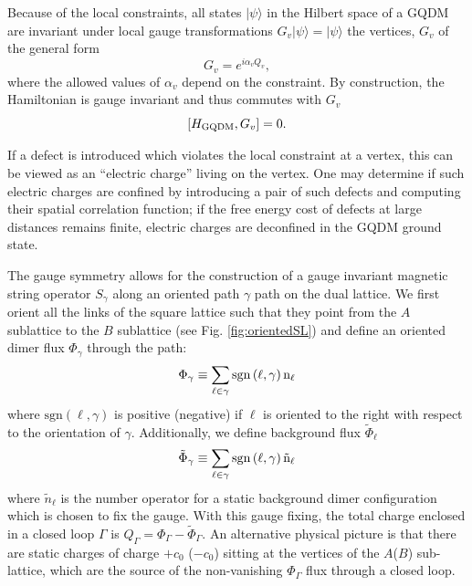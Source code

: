 \documentclass[twocolumn,prb,aps,floatfix,superscriptaddress]{revtex4-1}
\newcommand{\figref}[1]{Fig. \ref{#1}}
\newcommand{\ket}[1]{| #1 \rangle}
\begin{document}
Because of the local constraints, all states $\ket{\psi}$ in the Hilbert space of a GQDM are invariant under local gauge transformations $G_v \ket{\psi} = \ket{\psi}$ the vertices, $G_v$ of the general form~\cite{Moessner2001}
\begin{equation}
G_v = e^{i \alpha_v Q_v}, \label{eq:Gv}
\end{equation}
where the allowed values of $\alpha_v$ depend on the constraint.  
By construction, the Hamiltonian is gauge invariant and thus commutes with $G_v$
\begin{equation}
\left[ H_{\rm{GQDM}}, G_v \right] = 0. \notag
\end{equation}

If a defect is introduced which violates the local constraint at a vertex, this can be viewed as an ``electric charge'' living on the vertex. One may determine if such electric charges are confined by introducing a pair of such defects and computing their spatial correlation function; if the free energy cost of defects at large distances remains finite, electric charges are deconfined in the GQDM ground state.

The gauge symmetry allows for the construction of a gauge invariant magnetic string operator $S_\gamma$ along an oriented path $\gamma$ path on the dual lattice. We first orient all the links of the square lattice such that they point from the $A$ sublattice to the $B$ sublattice (see \figref{fig:orientedSL}) and define an oriented dimer flux $\Phi_\gamma$ through the path:
\begin{equation}
\Phi_\gamma \equiv \sum_{\ell \in \gamma} \rm{sgn}\left(\ell,\gamma\right) n_\ell \label{eq:phi}
\end{equation}
where $\mathrm{sgn}(\ell,\gamma)$ is positive (negative) if $\ell$ is oriented to the right with respect to the orientation of $\gamma$. Additionally, we define background flux $\tilde{\Phi}_\ell$
\begin{equation}
\tilde{\Phi}_\gamma \equiv  \sum_{\ell \in \gamma} \rm{sgn}\left(\ell,\gamma\right) \tilde{n}_\ell \label{eq:phiBackground}
\end{equation}
where $\tilde{n}_\ell$ is the number operator for a static background dimer configuration which is chosen to fix the gauge. With this gauge fixing, the total charge enclosed in a closed loop $\Gamma$ is $Q_\Gamma = \Phi_\Gamma- \tilde{\Phi}_\Gamma$. An alternative physical picture is that there are static charges of charge $+c_0$ ($-c_0$) sitting at the vertices of the $A$($B$) sub-lattice, which are the source of the non-vanishing $\Phi_\Gamma$ flux through a closed loop.
\end{document}
